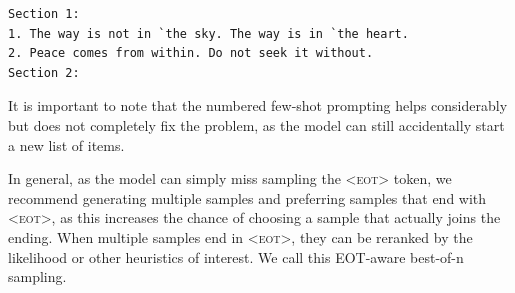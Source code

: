 \documentclass[postscript]{article}
\begin{document}
\vspace{-18pt}
\begin{center}
\begin{minipage}{5in}
\begin{lstlisting}[style=text]
Section 1:
1. The way is not in `the sky. The way is in `the heart.
2. Peace comes from within. Do not seek it without.
Section 2:
\end{lstlisting}
\end{minipage}
\end{center}
\vspace{-6pt}

It is important to note that the numbered few-shot prompting helps considerably but does not completely fix the problem, as the model can still accidentally start a new list of items.

In general, as the model can simply miss sampling the \textsc{<eot>} token, we recommend generating multiple samples and preferring samples that end with \textsc{<eot>}, as this increases the chance of choosing a sample that actually joins the ending. When multiple samples end in \textsc{<eot>}, they can be reranked by the likelihood or other heuristics of interest. We call this EOT-aware best-of-n sampling.
\end{document}
